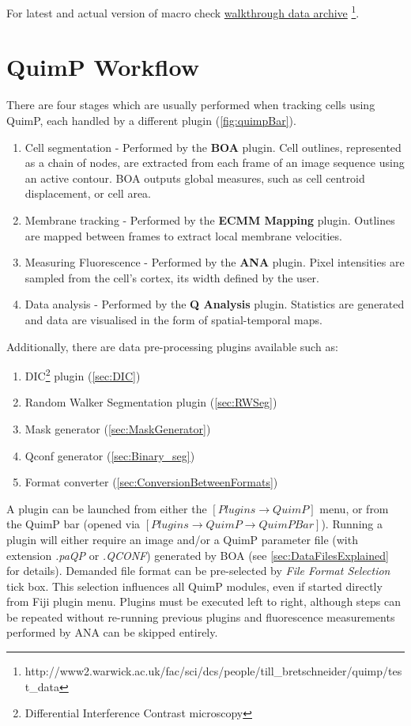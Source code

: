 \documentclass[a4paper,12pt]{article}
\begin{document}
For latest and actual version of macro check \href{http://www2.warwick.ac.uk/fac/sci/dcs/people/till\_bretschneider/quimp/test\_data}{walkthrough data archive} \footnote{http://www2.warwick.ac.uk/fac/sci/dcs/people/till\_bretschneider/quimp/test\_data}.

\section{QuimP Workflow}

There are four stages which are usually performed when tracking cells using QuimP, each handled by a different plugin (\autoref{fig:quimpBar}).

\begin{enumerate}
	\item Cell segmentation - Performed by the \textbf{BOA} plugin.  Cell outlines, represented as a chain of nodes, are extracted from each frame of an image sequence using an active contour. BOA outputs global measures, such as cell centroid displacement, or cell area.
	\item Membrane tracking - Performed by the \textbf{ECMM Mapping} plugin.  Outlines are mapped between frames to extract local membrane velocities.
	\item Measuring Fluorescence - Performed by the \textbf{ANA} plugin.  Pixel intensities are sampled from the cell's cortex, its width defined by the user.
	\item Data analysis - Performed by the \textbf{Q Analysis} plugin. Statistics are generated and data are visualised in the form of spatial-temporal maps.
\end{enumerate}

Additionally, there are data pre-processing plugins available such as:

\begin{enumerate}
	\item DIC\footnote{Differential Interference Contrast microscopy} plugin (\autoref{sec:DIC})
	\item Random Walker Segmentation plugin (\autoref{sec:RWSeg})
	\item Mask generator (\autoref{sec:MaskGenerator})
	\item Qconf generator (\autoref{sec:Binary_seg})
	\item Format converter (\autoref{sec:ConversionBetweenFormats})
\end{enumerate}

A plugin can be launched from either the $[Plugins\rightarrow QuimP]$ menu, or from the QuimP bar
(opened via $[Plugins\rightarrow QuimP\rightarrow QuimP Bar]$).
Running a plugin will either require an image and/or a QuimP parameter file (with extension \textit{.paQP} or  \textit{.QCONF}) generated by BOA (see \autoref{sec:DataFilesExplained} for details). Demanded file format can be pre-selected by \textit{File Format Selection} tick box. This selection influences all QuimP modules, even if started directly from Fiji plugin menu.
Plugins must be executed left to right, although steps can be repeated without re-running previous plugins and fluorescence measurements performed by ANA can be skipped entirely.
\end{document}
